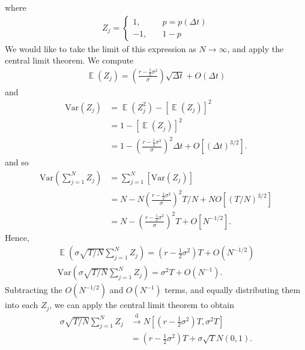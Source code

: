 \documentclass[12pt]{article}
\DeclareMathOperator{\ex}{\mathbb{E}}
\newcommand{\var}{\mathrm{Var}}
\theoremstyle{plain}
\theoremstyle{definition}
\theoremstyle{remark}
\numberwithin{equation}{section}  %
\begin{document}
where
\begin{equation*}
\begin{split}
	Z_{j} = \begin{cases}
		1, \quad & p = p(\Delta t) \\
		-1, \quad & 1-p  
	\end{cases}
\end{split}
\end{equation*}
We would like to take the limit of this expression as $N \to \infty$,
and apply the central limit theorem. We compute
\begin{equation*}
\begin{split}
	\ex(Z_{j}) = \left( \frac{r - \frac{1}{2} \sigma^{2}}{\sigma}
	\right)\sqrt{\Delta t}  + O(\Delta t)
\end{split}
\end{equation*}
and
\begin{equation*}
\begin{split}
	\var (Z_{j}) & = \ex(Z_{j}^2) - {[\ex(Z_{j})]}^{2} 
	\\
	& = 1 - {[\ex(Z_{j})]}^{2} 
	\\
	& = 1 - {\left( \frac{r - \frac{1}{2} \sigma^{2}}{\sigma}
\right)}^{2}
	\Delta t  + O[{(\Delta t)}^{3/2}].
\end{split}
\end{equation*}
and so
\begin{equation*}
\begin{split}
	\var(\sum_{j=1}^{N} Z_{j}) 
	& = \sum_{j=1}^{N}[\var(Z_{j})]
	\\
	& = N - N {\left( \frac{r - \frac{1}{2} \sigma^{2}}{\sigma}
\right)}^{2}
	T/N  + N O[{(T/N)}^{3/2}]
	\\
	& = N - {\left( \frac{r - \frac{1}{2} \sigma^{2}}{\sigma}
\right)}^{2}
	T  + O[N^{-1/2}].
	\end{split}
\end{equation*}
Hence,
\begin{gather*}
	\ex (\sigma \sqrt{T/N} \sum_{j=1}^{N} Z_{j}) =
	\left( r - \frac{1}{2} \sigma^{2} \right) T + O(N^{-1/2})
	\\
	\var (\sigma \sqrt{T/N} \sum_{j=1}^{N} Z_{j}) =
	\sigma^{2}T + O(N^{-1}).
\end{gather*}
Subtracting the $O(N^{-1/2})$  and $O(N^{-1})$ terms, and equally distributing
them into each $Z_{j}$, we can apply the central limit theorem to obtain
\begin{equation*}
\begin{split}
\sigma \sqrt{T/N} \sum_{j=1}^{N} Z_{j} 
& \xrightarrow{\text{d}}
N \left [\left(r - \frac{1}{2} \sigma^{2} \right )T, \sigma^{2}T \right]
\\
& = \left(r - \frac{1}{2} \sigma^{2} \right)T + \sigma \sqrt{T} N(0,1).
\end{split}
\end{equation*}
\end{document}
